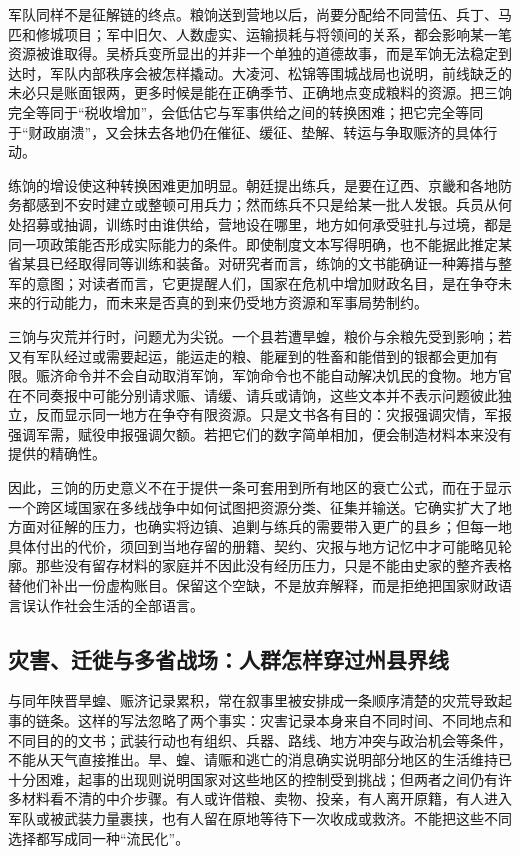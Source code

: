 军队同样不是征解链的终点。粮饷送到营地以后，尚要分配给不同营伍、兵丁、马匹和修城项目；军中旧欠、人数虚实、运输损耗与将领间的关系，都会影响某一笔资源被谁取得。吴桥兵变所显出的并非一个单独的道德故事，而是军饷无法稳定到达时，军队内部秩序会被怎样撬动。大凌河、松锦等围城战局也说明，前线缺乏的未必只是账面银两，更多时候是能在正确季节、正确地点变成粮料的资源。把三饷完全等同于“税收增加”，会低估它与军事供给之间的转换困难；把它完全等同于“财政崩溃”，又会抹去各地仍在催征、缓征、垫解、转运与争取赈济的具体行动。

练饷的增设使这种转换困难更加明显。朝廷提出练兵，是要在辽西、京畿和各地防务都感到不安时建立或整顿可用兵力；然而练兵不只是给某一批人发银。兵员从何处招募或抽调，训练时由谁供给，营地设在哪里，地方如何承受驻扎与过境，都是同一项政策能否形成实际能力的条件。即使制度文本写得明确，也不能据此推定某省某县已经取得同等训练和装备。对研究者而言，练饷的文书能确证一种筹措与整军的意图；对读者而言，它更提醒人们，国家在危机中增加财政名目，是在争夺未来的行动能力，而未来是否真的到来仍受地方资源和军事局势制约。

三饷与灾荒并行时，问题尤为尖锐。一个县若遭旱蝗，粮价与余粮先受到影响；若又有军队经过或需要起运，能运走的粮、能雇到的牲畜和能借到的银都会更加有限。赈济命令并不会自动取消军饷，军饷命令也不能自动解决饥民的食物。地方官在不同奏报中可能分别请求赈、请缓、请兵或请饷，这些文本并不表示问题彼此独立，反而显示同一地方在争夺有限资源。只是文书各有目的：灾报强调灾情，军报强调军需，赋役申报强调欠额。若把它们的数字简单相加，便会制造材料本来没有提供的精确性。

因此，三饷的历史意义不在于提供一条可套用到所有地区的衰亡公式，而在于显示一个跨区域国家在多线战争中如何试图把资源分类、征集并输送。它确实扩大了地方面对征解的压力，也确实将边镇、追剿与练兵的需要带入更广的县乡；但每一地具体付出的代价，须回到当地存留的册籍、契约、灾报与地方记忆中才可能略见轮廓。那些没有留存材料的家庭并不因此没有经历压力，只是不能由史家的整齐表格替他们补出一份虚构账目。保留这个空缺，不是放弃解释，而是拒绝把国家财政语言误认作社会生活的全部语言。

\subsection{灾害、迁徙与多省战场：人群怎样穿过州县界线}

与同年陕晋旱蝗、赈济记录累积，常在叙事里被安排成一条顺序清楚的灾荒导致起事的链条。这样的写法忽略了两个事实：灾害记录本身来自不同时间、不同地点和不同目的的文书；武装行动也有组织、兵器、路线、地方冲突与政治机会等条件，不能从天气直接推出。旱、蝗、请赈和逃亡的消息确实说明部分地区的生活维持已十分困难，起事的出现则说明国家对这些地区的控制受到挑战；但两者之间仍有许多材料看不清的中介步骤。有人或许借粮、卖物、投亲，有人离开原籍，有人进入军队或被武装力量裹挟，也有人留在原地等待下一次收成或救济。不能把这些不同选择都写成同一种“流民化”。

